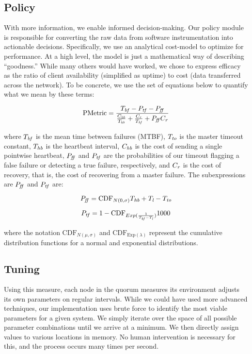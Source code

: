 \subsection{Policy}
With more information, we enable informed decision-making.
Our policy module is responsible for converting the raw data from software instrumentation into actionable decisions.
Specifically, we use an analytical cost-model to optimize for performance.
At a high level, the model is just a mathematical way of describing ``goodness.''
While many others would have worked, we chose to express efficacy as the ratio of client availability (simplified as uptime) to cost (data transferred across the network).
To be concrete, we use the set of equations below to quantify what we mean by these terms:

\begin{equation}
	\mathrm{PMetric} = \frac%
{	\Tbf - \Ptf - \Pff } %
{	\frac{\Chb}{\Thb} + \frac{\Cr}{\Tbf} + \Pff\Cr } %
\end{equation}

where $T_{\mathit{bf}}$ is the mean time between failures (MTBF), $T_{\mathit{to}}$ is the master timeout constant, $T_{\mathit{hb}}$ is the heartbeat interval, $C_{\mathit{hb}}$ is the cost of sending a single pointwise heartbeat, $P_{\mathit{ff}}$ and $P_{\mathit{tf}}$ are the probabilities of our timeout flagging a false failure or detecting a true failure, respectively, and $C_{\mathit{r}}$ is the cost of recovery, that is, the cost of recovering from a master failure.
The subexpressions are $P_{\mathit{ff}}$ and $P_{\mathit{tf}}$ are:

\begin{equation}
	P_{\mathit{ff}} = \mathrm{CDF}_{N(0,\sigma)} T_{\mathit{hb}} + T_{\mathit{l}} - T_{\mathit{to}}
\end{equation}

\begin{equation}
	P_{\mathit{tf}} = 1-\mathrm{CDF}_{Exp(\frac{1}{T_{\mathit{bf}}-T_{\mathit{l}}})} 1000
\end{equation}

where the notation $\mathrm{CDF}_{N(\mu,\sigma)}$ and $\mathrm{CDF}_{\mathrm{Exp}(\lambda)}$ represent the cumulative distribution functions for a normal and exponential distributions.

\subsection{Tuning}
Using this measure, each node in the quorum measures its environment adjusts its own parameters on regular intervals.
While we could have used more advanced techniques, our implementation uses brute force to identify the most viable parameters for a given system.
We simply iterate over the space of all possible parameter combinations until we arrive at a minimum.
We then directly assign values to various locations in memory.
No human intervention is necessary for this, and the process occurs many times per second.




